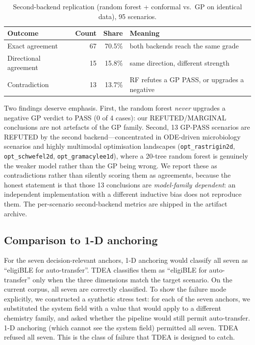 \documentclass[review,3p]{elsarticle}
\begin{document}
\begin{table}[h]
    \centering
    \caption{Second-backend replication (random forest + conformal vs.\ GP on
    identical data), 95 scenarios.}
    \label{tab:second-backend}
    \begin{tabular}{l r r l}
        \toprule
        Outcome & Count & Share & Meaning \\
        \midrule
        Exact agreement        & 67 & 70.5\% & both backends reach the same grade \\
        Directional agreement  & 15 & 15.8\% & same direction, different strength \\
        Contradiction          & 13 & 13.7\% & RF refutes a GP PASS, or upgrades a negative \\
        \bottomrule
    \end{tabular}
\end{table}

Two findings deserve emphasis. First, the random forest \emph{never} upgrades a negative GP verdict to PASS (0 of 4 cases): our REFUTED/MARGINAL conclusions are not artefacts of the GP family. Second, 13 GP-PASS scenarios are REFUTED by the second backend---concentrated in ODE-driven microbiology scenarios and highly multimodal optimisation landscapes (\texttt{opt\_rastrigin2d}, \texttt{opt\_schwefel2d}, \texttt{opt\_gramacylee1d}), where a 20-tree random forest is genuinely the weaker model rather than the GP being wrong. We report these as contradictions rather than silently scoring them as agreements, because the honest statement is that those 13 conclusions are \emph{model-family dependent}: an independent implementation with a different inductive bias does not reproduce them. The per-scenario second-backend metrics are shipped in the artifact archive.

\subsection{Comparison to 1-D anchoring}
\label{sec:comparison}

For the seven decision-relevant anchors, 1-D anchoring would classify all seven as ``eligiBLE for auto-transfer''. TDEA classifies them as ``eligiBLE for auto-transfer'' only when the three dimensions match the target scenario. On the current corpus, all seven are correctly classified. To show the failure mode explicitly, we constructed a synthetic stress test: for each of the seven anchors, we substituted the system field with a value that would apply to a different chemistry family, and asked whether the pipeline would still permit auto-transfer. 1-D anchoring (which cannot see the system field) permitted all seven. TDEA refused all seven. This is the class of failure that TDEA is designed to catch.
\end{document}
